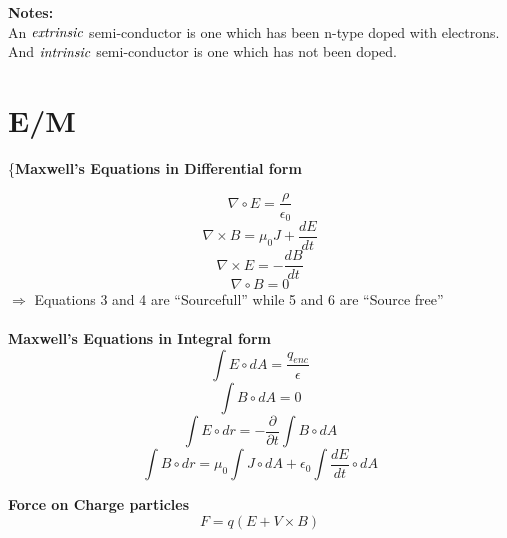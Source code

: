 \documentclass{article}
\begin{document}
{{\bf{Notes:}}\\
\hspace*{.5in}An $\emph{extrinsic}$ semi-conductor is one which has been n-type doped with electrons.\\
\hspace*{.5in}And $\emph{intrinsic}$ semi-conductor is one which has not been doped.




\section{E/M}
\{\bf{Maxwell's Equations in Differential form}} 


\begin{equation}\nabla \circ E=\frac{\rho}{\epsilon_0}\end{equation}
\begin{equation}\nabla \times B=\mu_0 J + \frac{dE}{dt}\end{equation}
\begin{equation}\nabla \times E=-\frac{dB}{dt}\end{equation}
\begin{equation}\nabla \circ B=0\end{equation}
$\Rightarrow$ Equations 3 and 4 are ``Sourcefull'' while 5 and 6 are ``Source free''\\
\\
{\bf{Maxwell's Equations in Integral form}}
\begin{equation}\int E \circ dA=\frac{q_{enc}}{\epsilon}\end{equation}
\begin{equation}\int B \circ dA=0\end{equation}
\begin{equation}\int E \circ dr=-\frac{\partial}{\partial t}\int B \circ dA \end{equation}
\begin{equation}\int B \circ dr=\mu_0 \int J \circ dA + \epsilon_0 \int \frac{dE}{dt}\circ dA\end{equation}

{\bf{Force on Charge particles}}\begin{equation}F=q(E+V\times B)\end{equation}
\end{document}

